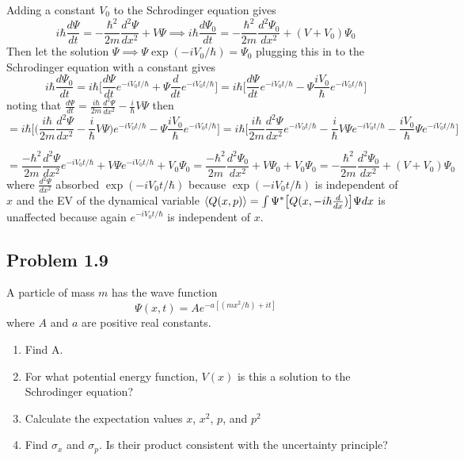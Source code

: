 \documentclass[12pt]{exam}
\begin{document}
\begin{solution}
    Adding a constant $V_0$ to the Schrodinger equation gives 
    $$i\hbar\frac{d\Psi}{dt} = -\frac{\hbar^2}{2m}\frac{d^2\Psi}{dx^2}+V\Psi \implies i\hbar\frac{d\Psi_0}{dt} = -\frac{\hbar^2}{2m}\frac{d^2\Psi_0}{dx^2}+(V+V_0)\Psi_0$$
    Then let the solution $\Psi \implies \Psi \exp(-iV_0/\hbar) = \Psi_0$ plugging this in to the Schrodinger equation with a constant gives
    $$i\hbar\frac{d\Psi_0}{dt}=i\hbar\bigg[\frac{d\Psi}{dt}e^{-iV_0t/\hbar} + \Psi \frac{d}{dt}e^{-iV_0t/\hbar}\bigg] = i\hbar\bigg[\frac{d\Psi}{dt}e^{-iV_0t/\hbar} - \Psi \frac{iV_0}{\hbar}e^{-iV_0t/\hbar}\bigg]$$
    noting that $\frac{d\Psi}{dt} = \frac{i\hbar}{2m}\frac{d^2\Psi}{dx^2} - \frac{i}{\hbar}V\Psi$ then 
    $$= i\hbar\bigg[\big(\frac{i\hbar}{2m}\frac{d^2\Psi}{dx^2} - \frac{i}{\hbar}V\Psi \big)e^{-iV_0t/\hbar} - \Psi \frac{iV_0}{\hbar}e^{-iV_0t/\hbar}\bigg]  = 
    i\hbar\bigg[\frac{i\hbar}{2m}\frac{d^2\Psi}{dx^2}e^{-iV_0t/\hbar} - \frac{i}{\hbar}V\Psi e^{-iV_0t/\hbar} -\frac{iV_0}{\hbar} \Psi e^{-iV_0t/\hbar}\bigg] $$

    $$= 
    \frac{-\hbar^2}{2m}\frac{d^2\Psi}{dx^2}e^{-iV_0t/\hbar} +V\Psi e^{-iV_0t/\hbar} +V_0 \Psi_0 =  \frac{-\hbar^2}{2m}\frac{d^2\Psi_0}{dx^2} +V\Psi_0 +V_0 \Psi_0 = -\frac{\hbar^2}{2m}\frac{d^2\Psi_0}{dx^2}+(V+V_0)\Psi_0$$
    where $\frac{d^2\Psi}{dx^2}$ absorbed $\exp(-iV_0t/\hbar)$ because $\exp(-iV_0t/\hbar)$ is independent of $x$ and the EV of the dynamical variable $\expval{Q(x,p)} = \int \Psi^* \big[Q(x,-i\hbar \frac{d}{dx})\big] \Psi dx$ is unaffected because again $e^{-iV_0t/\hbar}$ is  independent of $x$.
\end{solution}




\subsection*{Problem 1.9}
A particle of mass $m$ has the wave function $$\Psi(x,t) = Ae^{-a[(mx^2/\hbar)+it]}$$
where $A$ and $a$ are positive real constants.
\begin{enumerate}
    \item Find A.
    \item For what potential energy function, $V(x)$ is this a solution to the Schrodinger equation?
    \item Calculate the expectation values $x$, $x^2$, $p$, and $p^2$
    \item Find $\sigma_x$ and $\sigma_p$. Is their product consistent with the uncertainty principle?
\end{enumerate}
\end{document}
